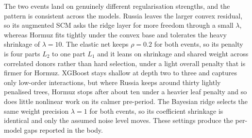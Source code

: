 The two events land on genuinely different regularisation strengths, and the pattern is
consistent across the models. Russia leaves the larger convex residual, so its augmented SCM asks
the ridge layer for more freedom through a small $\lambda$, whereas Hormuz fits tightly under the
convex base and tolerates the heavy shrinkage of $\lambda=10$. The elastic net keeps $\rho=0.2$
for both events, so its penalty is four parts $L_2$ to one part $L_1$ and it leans on shrinkage
and shared weight across correlated donors rather than hard selection, under a light overall
penalty that is firmer for Hormuz. XGBoost stays shallow at depth two to three and captures only
low-order interactions, but where Russia keeps around thirty lightly penalised trees, Hormuz
stops after about ten under a heavier leaf penalty and so does little nonlinear work on its calmer
pre-period. The Bayesian ridge selects the same weight precision $\lambda=1$ for both events, so
its coefficient shrinkage is identical and only the assumed noise level moves. These settings
produce the per-model gaps reported in the body.
